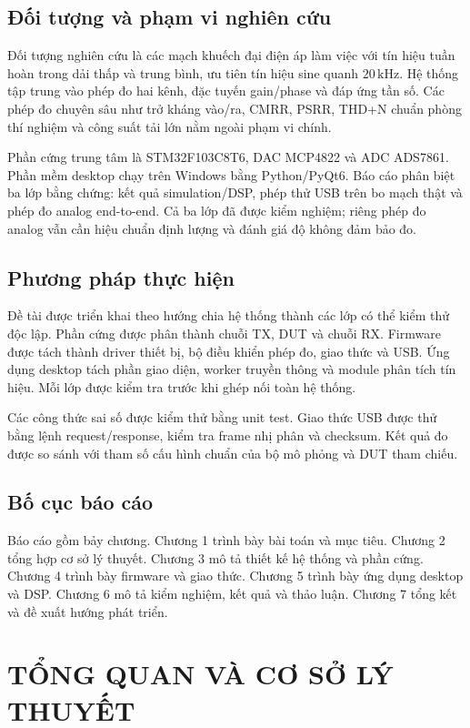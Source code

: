 \documentclass[12pt,a4paper]{report}
\newcommand{\unit}[1]{\,\mathrm{#1}}
\begin{document}
\section{Đối tượng và phạm vi nghiên cứu}
Đối tượng nghiên cứu là các mạch khuếch đại điện áp làm việc với tín hiệu tuần hoàn trong dải thấp và trung bình, ưu tiên tín hiệu sine quanh $20\unit{kHz}$. Hệ thống tập trung vào phép đo hai kênh, đặc tuyến gain/phase và đáp ứng tần số. Các phép đo chuyên sâu như trở kháng vào/ra, CMRR, PSRR, THD+N chuẩn phòng thí nghiệm và công suất tải lớn nằm ngoài phạm vi chính.

Phần cứng trung tâm là STM32F103C8T6, DAC MCP4822 và ADC ADS7861. Phần mềm desktop chạy trên Windows bằng Python/PyQt6. Báo cáo phân biệt ba lớp bằng chứng: kết quả simulation/DSP, phép thử USB trên bo mạch thật và phép đo analog end-to-end. Cả ba lớp đã được kiểm nghiệm; riêng phép đo analog vẫn cần hiệu chuẩn định lượng và đánh giá độ không đảm bảo đo.

\section{Phương pháp thực hiện}
Đề tài được triển khai theo hướng chia hệ thống thành các lớp có thể kiểm thử độc lập. Phần cứng được phân thành chuỗi TX, DUT và chuỗi RX. Firmware được tách thành driver thiết bị, bộ điều khiển phép đo, giao thức và USB. Ứng dụng desktop tách phần giao diện, worker truyền thông và module phân tích tín hiệu. Mỗi lớp được kiểm tra trước khi ghép nối toàn hệ thống.

Các công thức sai số được kiểm thử bằng unit test. Giao thức USB được thử bằng lệnh request/response, kiểm tra frame nhị phân và checksum. Kết quả đo được so sánh với tham số cấu hình chuẩn của bộ mô phỏng và DUT tham chiếu.

\section{Bố cục báo cáo}
Báo cáo gồm bảy chương. Chương 1 trình bày bài toán và mục tiêu. Chương 2 tổng hợp cơ sở lý thuyết. Chương 3 mô tả thiết kế hệ thống và phần cứng. Chương 4 trình bày firmware và giao thức. Chương 5 trình bày ứng dụng desktop và DSP. Chương 6 mô tả kiểm nghiệm, kết quả và thảo luận. Chương 7 tổng kết và đề xuất hướng phát triển.

\chapter{TỔNG QUAN VÀ CƠ SỞ LÝ THUYẾT}
\end{document}
